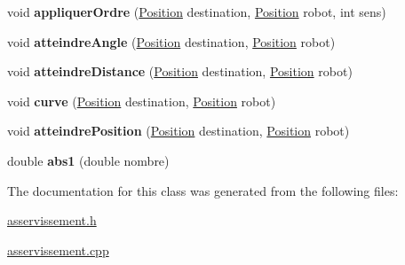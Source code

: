 \begin{DoxyCompactItemize}
\item 
void {\bfseries appliquer\+Ordre} (\hyperlink{struct_position}{Position} destination, \hyperlink{struct_position}{Position} robot, int sens)\hypertarget{class_asservissement_a8eeb4d2ea61bdad69173765ef3dc05b4}{}\label{class_asservissement_a8eeb4d2ea61bdad69173765ef3dc05b4}

\item 
void {\bfseries atteindre\+Angle} (\hyperlink{struct_position}{Position} destination, \hyperlink{struct_position}{Position} robot)\hypertarget{class_asservissement_a31365ebbbf9f9309d9b4556e4e753dff}{}\label{class_asservissement_a31365ebbbf9f9309d9b4556e4e753dff}

\item 
void {\bfseries atteindre\+Distance} (\hyperlink{struct_position}{Position} destination, \hyperlink{struct_position}{Position} robot)\hypertarget{class_asservissement_afe6baa10d9ec255aa5268122f0c9b6d5}{}\label{class_asservissement_afe6baa10d9ec255aa5268122f0c9b6d5}

\item 
void {\bfseries curve} (\hyperlink{struct_position}{Position} destination, \hyperlink{struct_position}{Position} robot)\hypertarget{class_asservissement_a0017ded3b839ece7403a5c63a2f50fe8}{}\label{class_asservissement_a0017ded3b839ece7403a5c63a2f50fe8}

\item 
void {\bfseries atteindre\+Position} (\hyperlink{struct_position}{Position} destination, \hyperlink{struct_position}{Position} robot)\hypertarget{class_asservissement_a0ddbc9243384337c1f3af07ffc8b85b0}{}\label{class_asservissement_a0ddbc9243384337c1f3af07ffc8b85b0}

\item 
double {\bfseries abs1} (double nombre)\hypertarget{class_asservissement_a7f53388f95bfd3450d4da5a1c0a45075}{}\label{class_asservissement_a7f53388f95bfd3450d4da5a1c0a45075}

\end{DoxyCompactItemize}


The documentation for this class was generated from the following files\+:\begin{DoxyCompactItemize}
\item 
\hyperlink{asservissement_8h}{asservissement.\+h}\item 
\hyperlink{asservissement_8cpp}{asservissement.\+cpp}\end{DoxyCompactItemize}
